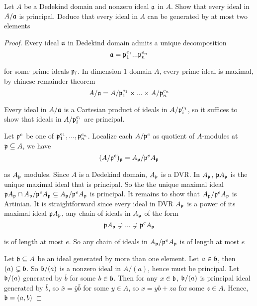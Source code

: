 \begin{problem}
	Let $A$ be a Dedekind domain and nonzero ideal $\mathfrak{a}$ in $A$. Show that every ideal in $A / \mathfrak{a}$ is principal. Deduce that every ideal in $A$ can be generated by at most two elements
\end{problem}

\begin{proof}
	Every ideal $\mathfrak{a}$ in Dedekind domain admits a unique decomposition
	$$
		\mathfrak{a} = \mathfrak{p}_1^{e_1} ... \mathfrak{p}_n^{e_n}
	$$
	
	for some prime ideals $\mathfrak{p}_i$. In dimension $1$ domain $A$, every prime ideal is maximal, by chinese remainder theorem
	$$
		A / \mathfrak{a} = A / \mathfrak{p}_1^{e_1} \times ... \times A / \mathfrak{p}_n^{e_n}
	$$
	
	Every ideal in $A / \mathfrak{a}$ is a Cartesian product of ideals in $A / \mathfrak{p}_i^{e_i}$, so it suffices to show that ideals in $A / \mathfrak{p}_i^{e_i}$ are principal.
	
	Let $\mathfrak{p}^e$ be one of $\mathfrak{p}_1^{e_1}, ..., \mathfrak{p}_n^{e_n}$. Localize each $A / \mathfrak{p}^e$ as quotient of $A$-modules at $\mathfrak{p} \subseteq A$, we have
	$$
		(A / \mathfrak{p}^e)_{\mathfrak{p}} = A_{\mathfrak{p}} / \mathfrak{p}^e A_{\mathfrak{p}}
	$$
	
	as $A_{\mathfrak{p}}$ modules. Since $A$ is a Dedekind domain, $A_{\mathfrak{p}}$ is a DVR. In $A_{\mathfrak{p}}$, $\mathfrak{p} A_{\mathfrak{p}}$ is the unique maximal ideal that is principal. So the the unique maximal ideal $\mathfrak{p} A_{\mathfrak{p}} \cap A_{\mathfrak{p}} / \mathfrak{p}^e A_{\mathfrak{p}} \subseteq A_{\mathfrak{p}} / \mathfrak{p}^e A_{\mathfrak{p}}$ is principal. It remains to show that $A_{\mathfrak{p}} / \mathfrak{p}^e A_{\mathfrak{p}}$ is Artinian. It is straightforward since every ideal in DVR $A_{\mathfrak{p}}$ is a power of its maximal ideal $\mathfrak{p} A_{\mathfrak{p}}$, any chain of ideals in $A_{\mathfrak{p}}$ of the form 
	$$
		\mathfrak{p} A_{\mathfrak{p}} \supsetneq ... \supsetneq \mathfrak{p}^e A_{\mathfrak{p}}
	$$
	
	is of length at most $e$. So any chain of ideals in $A_{\mathfrak{p}} / \mathfrak{p}^e A_{\mathfrak{p}}$ is of length at most $e$
	
	Let $\mathfrak{b} \subseteq A$ be an ideal generated by more than one element. Let $a \in \mathfrak{b}$, then $(a) \subsetneq \mathfrak{b}$. So $\mathfrak{b} / (a)$ is a nonzero ideal in $A / (a)$, hence must be principal. Let $\mathfrak{b} / (a)$ generated by $\bar{b}$ for some $b \in \mathfrak{b}$. Then for any $x \in \mathfrak{b}$, $\mathfrak{b} / (a)$ is principal ideal generated by $\bar{b}$, so $\bar{x} = \bar{y} \bar{b}$ for some $y \in A$, so $x = yb + za$ for some $z \in A$. Hence, $\mathfrak{b} = (a, b)$
\end{proof}

